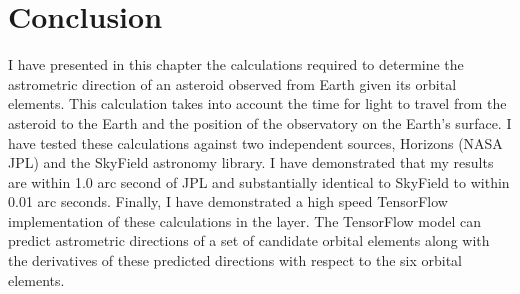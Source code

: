 \section{Conclusion}
\label{section_conclusion}
I have presented in this chapter the calculations required to determine the astrometric direction 
of an asteroid observed from Earth given its orbital elements.
This calculation takes into account the time for light to travel from the asteroid to the Earth
and the position of the observatory on the Earth's surface.
I have tested these calculations against two independent sources, Horizons (NASA JPL) and the SkyField astronomy library.
I have demonstrated that my results are within 1.0 arc second of JPL and substantially identical to SkyField to within 0.01 arc seconds.
Finally, I have demonstrated a high speed TensorFlow implementation of these calculations in the  layer.
The TensorFlow model can predict astrometric directions of a set of candidate orbital elements 
along with the derivatives of these predicted directions with respect to the six orbital elements.
